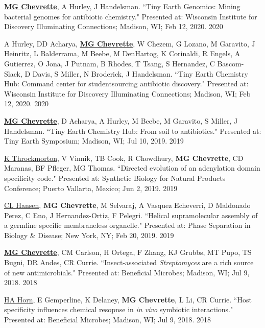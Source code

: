 
\begin{cvpubs}

\cvpub
{\underline{\textbf{MG Chevrette}}, A Hurley, J Handelsman. ``Tiny Earth Genomics: Mining bacterial genomes for antibiotic chemistry." Presented at: Wisconsin Institute for Discovery Illuminating Connections; Madison, WI; Feb 12, 2020.}
{2020}

\cvpub
{A Hurley, DD Acharya, \underline{\textbf{MG Chevrette}}, W Chezem, G Lozano, M Garavito, J Heinritz, L Balderrama, M Beebe, M DenHartog, K Corinaldi, R Engels, A Gutierrez, O Jona, J Putnam, B Rhodes, T Tsang, S Hernandez, C Bascom-Slack, D Davis, S Miller, N Broderick, J Handelsman. ``Tiny Earth Chemistry Hub: Command center for studentsourcing antibiotic discovery." Presented at: Wisconsin Institute for Discovery Illuminating Connections; Madison, WI; Feb 12, 2020.}
{2020}

\cvpub
{\underline{\textbf{MG Chevrette}}, D Acharya, A Hurley, M Beebe, M Garavito, S Miller, J Handelsman. ``Tiny Earth Chemistry Hub: From soil to antibiotics." Presented at: Tiny Earth Symposium; Madison, WI; Jul 10, 2019.}
{2019}

\end{cvpubs} \begin{cvpubs}

\cvpub
{\underline{K Throckmorton}, V Vinnik, TB Cook, R Chowdhury, \textbf{MG Chevrette}, CD Maranas, BF Pfleger, MG Thomas. ``Directed evolution of an adenylation domain specificity code." Presented at: Synthetic Biology for Natural Products Conference; Puerto Vallarta, Mexico; Jun 2, 2019.}
{2019}

\cvpub
{\underline{CL Hansen}, \textbf{MG Chevrette}, M Selvaraj, A Vasquez Echeverri, D Maldonado Perez, C Eno, J Hernandez-Ortiz, F Pelegri. ``Helical supramolecular assembly of a germline specific membraneless organelle." Presented at: Phase Separation in Biology \& Disease; New York, NY; Feb 20, 2019.}
{2019}

\cvpub
{\underline{\textbf{MG Chevrette}}, CM Carlson, H Ortega, F Zhang, KJ Grubbs, MT Pupo, TS Bugni, DR Andes, CR Currie. ``Insect-associated \textit{Streptomyces} are a rich source of new antimicrobials." Presented at: Beneficial Microbes; Madison, WI; Jul 9, 2018.}
{2018}

\cvpub
{\underline{HA Horn}, E Gemperline, K Delaney, \textbf{MG Chevrette}, L Li, CR Currie. ``Host specificity influences chemical resopnse in \textit{in vivo} symbiotic interactions." Presented at: Beneficial Microbes; Madison, WI; Jul 9, 2018.}
{2018}


\end{cvpubs}
